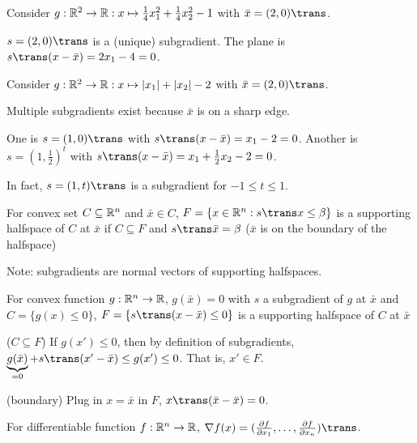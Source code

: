 
\begin{example}
  Consider $g : \mathbb{R}^2 \to \mathbb{R} : x \mapsto \frac14 x_1^2 + \frac14 x_2^2 - 1$ with
  $\bar x = (2,0)\trans$.

  $s = (2,0)\trans$ is a (unique) subgradient.
  The plane is $s\trans (x - \bar x) = 2x_1 - 4 = 0$.
\end{example}

\begin{example}
  Consider $g : \mathbb{R}^2 \to \mathbb{R} : x \mapsto \abs{x_1} + \abs{x_2} - 2$ with
  $\bar x = (2,0)\trans$.

  Multiple subgradients exist because $\bar x$ is on a sharp edge.

  One is $s = (1,0)\trans$ with $s\trans(x - \bar x) = x_1 - 2 = 0$.
  Another is $s = (1,\frac12)^t$ with $s\trans(x - \bar x) = x_1 + \frac12 x_2 - 2 = 0$.

  In fact, $s = (1,t)\trans$ is a subgradient for $-1 \leq t \leq 1$.
\end{example}

\begin{defn}
  For convex set $C \subseteq\mathbb{R}^n$
  and $\bar x \in C$, $F = \{x \in \R^n : s\trans x \leq \beta\}$ is a
  supporting halfspace of $C$ at $\bar x$ if $C \subseteq F$ and
  $s\trans \bar x = \beta$
  ($\bar x$ is on the boundary of the halfspace)
\end{defn}

Note: subgradients are normal vectors of supporting halfspaces.

\begin{theorem}
  For convex function $g : \mathbb{R}^n \to \mathbb{R}$, $g(\bar x) = 0$
  with $s$ a subgradient of $g$ at $\bar x$ and $C = \{g(x) \leq 0\}$,
  $F = \{s\trans(x-\bar x)\leq 0\}$ is a supporting halfspace of $C$ at $\bar x$
\end{theorem}
\begin{prf}
  ($C \subseteq F$) If $g(x') \leq 0$, then by definition of subgradients,
  $\underbrace{g(\bar x)}_{=0} + s\trans(x' - \bar x) \leq g(x') \leq 0$.
  That is, $x' \in F$.

  (boundary) Plug in $x = \bar x$ in $F$, $x\trans (\bar x - \bar x) = 0$.
\end{prf}

\begin{defn}[gradient]
  For differentiable function $f : \mathbb{R}^n \to \mathbb{R}$,
  $\nabla f(x) = (\pdv{f}{x_1},\dotsc,\pdv{f}{x_n})\trans$.
\end{defn}

